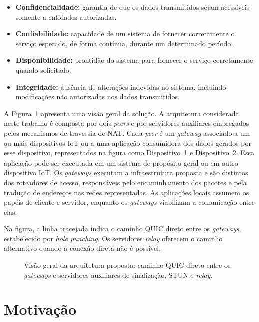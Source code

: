 \begin{itemize}
    \item \textbf{Confidencialidade:} garantia de que os dados transmitidos sejam acessíveis somente a entidades autorizadas.
    \item \textbf{Confiabilidade:} capacidade de um sistema de fornecer corretamente o serviço esperado, de forma contínua, durante um determinado período.
    \item \textbf{Disponibilidade:} prontidão do sistema para fornecer o serviço corretamente quando solicitado.
    \item \textbf{Integridade:} ausência de alterações indevidas no sistema, incluindo modificações não autorizadas nos dados transmitidos.
\end{itemize}

A Figura~\ref{fig:quic_p2p_architecture} apresenta uma visão geral da solução. A arquitetura considerada neste trabalho é composta por dois \textit{peers} e por servidores auxiliares empregados pelos mecanismos de travessia de NAT. Cada \textit{peer} é um \textit{gateway} associado a um ou mais dispositivos IoT ou a uma aplicação consumidora dos dados gerados por esse dispositivo, representados na figura como Dispositivo~1 e Dispositivo~2. Essa aplicação pode ser executada em um sistema de propósito geral ou em outro dispositivo IoT. Os \textit{gateways} executam a infraestrutura proposta e são distintos dos roteadores de acesso, responsáveis pelo encaminhamento dos pacotes e pela tradução de endereços nas redes representadas. As aplicações locais assumem os papéis de cliente e servidor, enquanto os \textit{gateways} viabilizam a comunicação entre elas.

Na figura, a linha tracejada indica o caminho QUIC direto entre os \textit{gateways}, estabelecido por \textit{hole punching}. Os servidores \textit{relay} oferecem o caminho alternativo quando a conexão direta não é possível.

\begin{figure}[!ht]
    \centering
    
    \caption{Visão geral da arquitetura proposta: caminho QUIC direto entre os \textit{gateways} e servidores auxiliares de sinalização, STUN e \textit{relay}.}
    \label{fig:quic_p2p_architecture}
\end{figure}

\section{Motivação}

